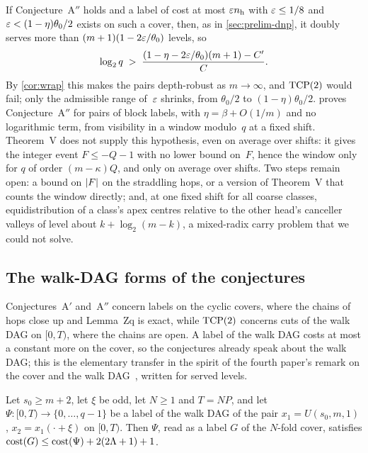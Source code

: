 If Conjecture~A$''$ holds and a label of cost at most $\varepsilon n_{\mathrm h}$ with $\varepsilon\le1/8$ and $\varepsilon<(1-\eta)\theta_0/2$
exists on such a cover, then, as in \cref{sec:prelim-dnp}, it doubly serves more than $(m+1)(1-2\varepsilon/\theta_0)$ levels, so
\[
  \log_2q\;>\;\frac{(1-\eta-2\varepsilon/\theta_0)(m+1)-C'}{C}.
\]
By \cref{cor:wrap} this makes the pairs depth-robust as $m\to\infty$, and $\mathrm{TCP}(2)$ would fail; only the admissible
range of~$\varepsilon$ shrinks, from $\theta_0/2$ to $(1-\eta)\theta_0/2$.  proves Conjecture~A$''$ for pairs of
block labels, with $\eta=\beta+O(1/m)$ and no logarithmic term, from visibility in a window modulo~$q$ at a fixed shift.
Theorem~V does not supply this hypothesis, even on average over shifts: it gives the integer event $F\le-Q-1$ with no lower
bound on~$F$, hence the window only for $q$ of order $(m-\kappa)Q$, and only on average over shifts. Two steps remain open: a
bound on $\lvert F \rvert$ on the straddling hops, or a version of Theorem~V that counts the window directly; and, at one fixed shift
for all coarse classes, equidistribution of a class's apex centres relative to the other head's canceller valleys of level
about $k+\log_2(m-k)$, a mixed-radix carry problem that we could not solve.

\subsection{The walk-DAG forms of the conjectures}\label{sec:dnp-wrap}

Conjectures~A$'$ and~A$''$ concern labels on the cyclic covers, where the chains of hops close up and Lemma~Zq is exact,
while $\mathrm{TCP}(2)$ concerns cuts of the walk DAG on $[0,T)$, where the chains are open. A label of the walk DAG costs at most
a constant more on the cover, so the conjectures already speak about the walk DAG; this is the elementary transfer in the
spirit of the fourth paper's remark on the cover and the walk DAG~\cite[Remark~5.23]{FourthPaper2026}, written for
served levels.

\begin{lemma}\label{lem:wrap}
\notformalized
Let $s_0\ge m+2$, let $\xi$ be odd, let $N\ge1$ and $T=NP$, and let $\Psi\colon[0,T)\to\{0,\dots,q-1\}$ be a label of the
walk DAG of the pair $x_1=U(s_0,m,1)$, $x_2=x_1(\cdot+\xi)$ on $[0,T)$. Then $\Psi$, read as a label $G$ of the $N$-fold
cover, satisfies $\mathrm{cost}(G)\le\mathrm{cost}(\Psi)+2(2\Lambda+1)+1$.
\end{lemma}


